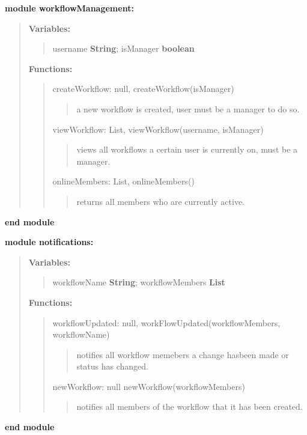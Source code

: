 \documentclass{article}
\begin{document}
\noindent \textbf{module workflowManagement:}
\begin{quote}
  \textbf{Variables:}
  \begin{quote}
    username \textbf{String}; isManager \textbf{boolean}
  \end{quote}

  \textbf{Functions:}
  \begin{quote}

    createWorkflow: null, createWorkflow(isManager)
    \begin{quote}
      a new workflow is created, user must be a manager to do so.
    \end{quote}

    viewWorkflow: List, viewWorkflow(username, isManager)
    \begin{quote}
      views all workflows a certain user is currently on, must be a manager.
    \end{quote}

    onlineMembers: List, onlineMembers()
    \begin{quote}
      returns all members who are currently active.
    \end{quote}

  \end{quote}
\end{quote}
\textbf{end module}
\bigbreak

\noindent \textbf{module notifications:}
\begin{quote}
  \textbf{Variables:}
  \begin{quote}
    workflowName \textbf{String}; workflowMembers \textbf{List}
  \end{quote}

  \textbf{Functions:}
  \begin{quote}

    workflowUpdated: null, workFlowUpdated(workflowMembers, workflowName)
    \begin{quote}
      notifies all workflow memebers a change hasbeen made or status has changed.
    \end{quote}

    newWorkflow: null newWorkflow(workflowMembers)
    \begin{quote}
      notifies all members of the workflow that it has been created.
    \end{quote}

  \end{quote}
\end{quote}
\textbf{end module}
\bigbreak
\end{document}
